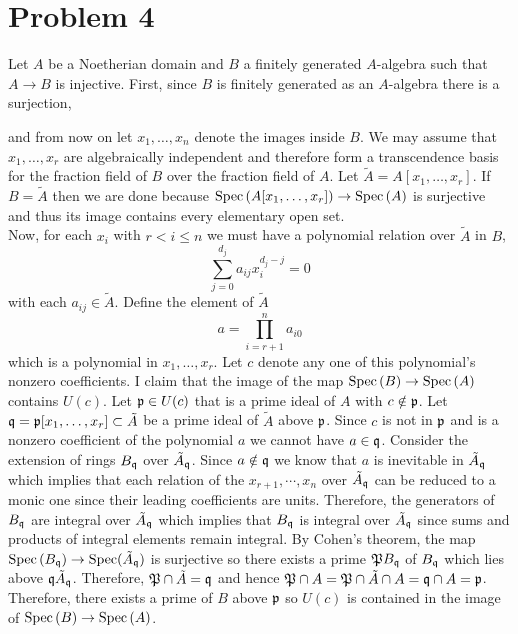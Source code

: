 \documentclass[12pt]{extarticle}
\begin{document}
\section*{Problem 4}

Let $A$ be a Noetherian domain and $B$ a finitely generated $A$-algebra such that $A \to B$ is injective. First, since $B$ is finitely generated as an $A$-algebra there is a surjection,
\begin{center}
\end{center}
and from now on let $x_1, \dots, x_n$ denote the images inside $B$. We may assume that $x_1, \dots, x_r$ are algebraically independent and therefore form a transcendence basis for the fraction field of $B$ over the fraction field of $A$. Let $\tilde{A} = A[x_1, \dots, x_r]$. If $B = \tilde{A}$ then we are done because $\mathrm{Spec}\left( A[x_1, \dots, x_r] \right) \to \mathrm{Spec}\left( A \right)$ is surjective and thus its image contains every elementary open set. 
\bigskip\\
Now, for each $x_i$ with $r < i \le n$ we must have a polynomial relation over $\tilde{A}$ in $B$,
\[ \sum_{j = 0}^{d_j} a_{ij} x_i^{d_j - j} = 0 \]
with each $a_{ij} \in \tilde{A}$. Define the element of $\tilde{A}$
\[ a = \prod_{i = r + 1}^n a_{i0} \]
which is a polynomial in $x_1, \dots, x_r$. Let $c$ denote any one of this polynomial's nonzero coefficients. I claim that the image of the map $\mathrm{Spec}\left( B \right) \to \mathrm{Spec}\left( A \right)$ contains $U(c)$. Let $\mathfrak{p} \in U(c)$ that is a prime ideal of $A$ with $c \notin \mathfrak{p}$. Let $\mathfrak{q} = \mathfrak{p}[x_1, \dots, x_r] \subset \tilde{A}$ be a prime ideal of $\tilde{A}$ above $\mathfrak{p}$. Since $c$ is not in $\mathfrak{p}$ and is a nonzero coefficient of the polynomial $a$ we cannot have $a \in \mathfrak{q}$. Consider the extension of rings $B_{\mathfrak{q}}$ over $\tilde{A}_{\mathfrak{q}}$. Since $a \notin \mathfrak{q}$ we know that $a$ is inevitable in $\tilde{A}_{\mathfrak{q}}$ which implies that each relation of the $x_{r+1}, \cdots, x_n$ over $\tilde{A}_{\mathfrak{q}}$ can be reduced to a monic one since their leading coefficients are units. Therefore, the generators of $B_{\mathfrak{q}}$ are integral over $\tilde{A}_{\mathfrak{q}}$ which implies that $B_{\mathfrak{q}}$ is integral over $\tilde{A}_{\mathfrak{q}}$ since sums and products of integral elements remain integral. By Cohen's theorem, the map $\mathrm{Spec}\left( B_{\mathfrak{q}} \right) \to \mathrm{Spec}{(\tilde{A}_{\mathfrak{q}})}$ is surjective so there exists a prime $\mathfrak{P} B_{\mathfrak{q}}$ of $B_{\mathfrak{q}}$ which lies above $\mathfrak{q} \tilde{A}_{\mathfrak{q}}$. Therefore, $\mathfrak{P} \cap \tilde{A} = \mathfrak{q}$ and hence $\mathfrak{P} \cap A = \mathfrak{P} \cap \tilde{A} \cap A = \mathfrak{q} \cap A = \mathfrak{p}$. Therefore, there exists a prime of $B$ above $\mathfrak{p}$ so $U(c)$ is contained in the image of $\mathrm{Spec}\left( B \right) \to \mathrm{Spec}\left( A \right)$. 
\end{document}
